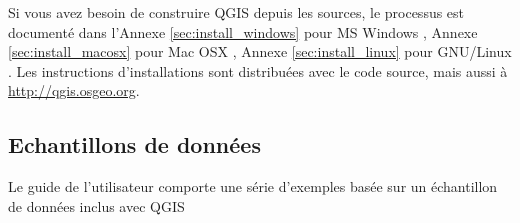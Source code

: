 Si vous avez besoin de construire QGIS depuis les sources, le processus est document\'e dans l'Annexe 
\ref{sec:install_windows} pour MS Windows \win, Annexe 
\ref{sec:install_macosx} pour Mac OSX \osx, Annexe \ref{sec:install_linux} pour GNU/Linux \nix. Les instructions d'installations sont distribu\'ees avec le code source, mais aussi \`a \url{http://qgis.osgeo.org}.

%
%
%

\subsection{Echantillons de donn\'ees}\label{label_sampledata}  

Le guide de l'utilisateur comporte une s\'erie d'exemples bas\'ee sur un \'echantillon de donn\'ees inclus avec QGIS

